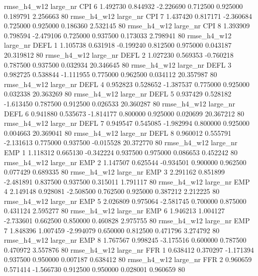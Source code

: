  rmse_h4_w12   large_nr      CPI                 6  1.492730  0.844932  -2.226690 0.712500 0.925000  0.189791    2.256663 80
 rmse_h4_w12   large_nr      CPI                 7  1.437420  0.817171  -2.360684 0.725000 0.925000  0.186360    2.532145 80
 rmse_h4_w12   large_nr      CPI                 8  1.393909  0.798594  -2.479106 0.725000 0.937500  0.173033    2.798941 80
 rmse_h4_w12   large_nr     DEFL                 1  1.105738  0.631918  -0.199240 0.812500 0.975000  0.043187   20.319812 80
 rmse_h4_w12   large_nr     DEFL                 2  1.027230  0.569353  -0.760218 0.787500 0.937500  0.032934   20.346645 80
 rmse_h4_w12   large_nr     DEFL                 3  0.982725  0.538844  -1.111955 0.775000 0.962500  0.034112   20.357987 80
 rmse_h4_w12   large_nr     DEFL                 4  0.952823  0.528652  -1.387537 0.775000 0.925000  0.032338   20.363269 80
 rmse_h4_w12   large_nr     DEFL                 5  0.937429  0.528182  -1.613450 0.787500 0.912500  0.026533   20.360287 80
 rmse_h4_w12   large_nr     DEFL                 6  0.941880  0.535673  -1.814177 0.800000 0.925000  0.020699   20.367212 80
 rmse_h4_w12   large_nr     DEFL                 7  0.949547  0.545085  -1.982994 0.800000 0.925000  0.004663   20.369041 80
 rmse_h4_w12   large_nr     DEFL                 8  0.960012  0.555791  -2.131613 0.775000 0.937500 -0.015528   20.372770 80
 rmse_h4_w12   large_nr      EMP                 1  1.118312  0.665130  -0.342224 0.937500 0.975000  0.086653    0.452242 80
 rmse_h4_w12   large_nr      EMP                 2  1.147507  0.625544  -0.934501 0.900000 0.962500  0.077429    0.689335 80
 rmse_h4_w12   large_nr      EMP                 3  2.291162  0.851899  -2.481891 0.837500 0.937500  0.315011    1.791117 80
 rmse_h4_w12   large_nr      EMP                 4  2.149148  0.928081  -2.508500 0.762500 0.925000  0.387212    2.212225 80
 rmse_h4_w12   large_nr      EMP                 5  2.026809  0.975064  -2.581745 0.700000 0.875000  0.431124    2.595277 80
 rmse_h4_w12   large_nr      EMP                 6  1.946213  1.004127  -2.733601 0.662500 0.850000  0.460828    2.975755 80
 rmse_h4_w12   large_nr      EMP                 7  1.848396  1.007459  -2.994079 0.650000 0.812500  0.471796    3.274792 80
 rmse_h4_w12   large_nr      EMP                 8  1.767567  0.998245  -3.175516 0.600000 0.787500  0.470972    3.557876 80
 rmse_h4_w12   large_nr      FFR                 1  0.638412  0.370297  -1.171394 0.937500 0.950000  0.007187    0.638412 80
 rmse_h4_w12   large_nr      FFR                 2  0.960659  0.571414  -1.566730 0.912500 0.950000  0.028001    0.960659 80
